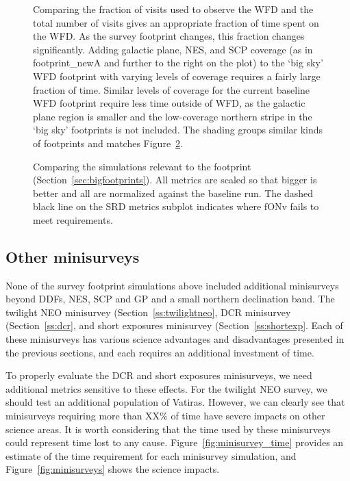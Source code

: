 \begin{figure}
\caption{Comparing the fraction of visits used to observe the WFD and the total number of visits gives an appropriate fraction of time spent on the WFD. As the survey footprint changes, this fraction changes significantly. Adding galactic plane, NES, and SCP coverage (as in footprint\_newA and further to the right on the plot) to the `big sky' WFD footprint with varying levels of coverage requires a fairly large fraction of time. Similar levels of coverage for the current baseline WFD footprint require less time outside of WFD, as the galactic plane region is smaller and the low-coverage northern stripe in the `big sky' footprints  is not included. The shading groups similar kinds of footprints and matches Figure~\ref{fig:footprint}.}
\label{fig:footprint_wfdfraction}
\end{figure}

\begin{figure}
\caption{Comparing the simulations relevant to the footprint (Section~\ref{sec:bigfootprints}). All metrics are scaled so that bigger is better and all are normalized against the baseline run. The dashed black line on the SRD metrics subplot indicates where fONv fails to meet requirements.}
\label{fig:footprint}
\end{figure}


\subsection{Other minisurveys}\label{sec:minisurveys}

None of the survey footprint simulations above included additional minisurveys beyond DDFs, NES, SCP and GP and a small northern declination band. The twilight NEO minisurvey (Section~\ref{ss:twilightneo}, DCR minisurvey (Section~\ref{ss:dcr}, and short exposures minisurvey (Section~\ref{ss:shortexp}. Each of these minisurveys has various science advantages and disadvantages presented in the previous sections, and each requires an additional investment of time. 

To properly evaluate the DCR and short exposures minisurveys, we need additional metrics sensitive to these effects. For the twilight NEO survey, we should test an additional population of Vatiras. However, we can clearly see that minisurveys requiring more than XX\% of time have severe impacts on other science areas.  It is worth considering that the time used by these minisurveys could represent time lost to any cause. Figure~\ref{fig:minisurvey_time} provides an estimate of the time requirement for each minisurvey simulation, and Figure~\ref{fig:minisurveys} shows the science impacts. 

